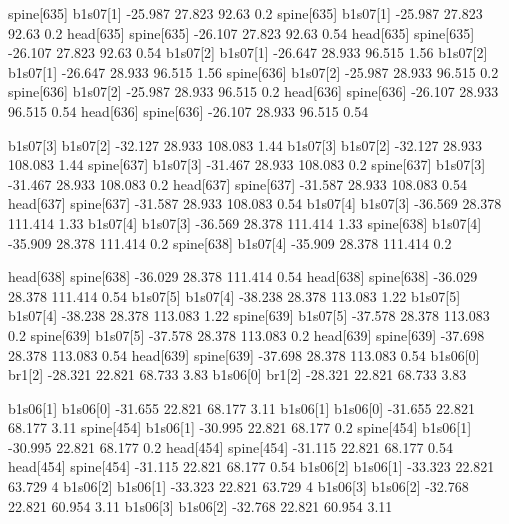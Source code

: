 spine[635]    b1s07[1]    -25.987    27.823    92.63    0.2
spine[635]    b1s07[1]    -25.987    27.823    92.63    0.2
head[635]    spine[635]    -26.107    27.823    92.63    0.54
head[635]    spine[635]    -26.107    27.823    92.63    0.54
b1s07[2]    b1s07[1]    -26.647    28.933    96.515    1.56
b1s07[2]    b1s07[1]    -26.647    28.933    96.515    1.56
spine[636]    b1s07[2]    -25.987    28.933    96.515    0.2
spine[636]    b1s07[2]    -25.987    28.933    96.515    0.2
head[636]    spine[636]    -26.107    28.933    96.515    0.54
head[636]    spine[636]    -26.107    28.933    96.515    0.54


b1s07[3]    b1s07[2]    -32.127    28.933    108.083    1.44
b1s07[3]    b1s07[2]    -32.127    28.933    108.083    1.44
spine[637]    b1s07[3]    -31.467    28.933    108.083    0.2
spine[637]    b1s07[3]    -31.467    28.933    108.083    0.2
head[637]    spine[637]    -31.587    28.933    108.083    0.54
head[637]    spine[637]    -31.587    28.933    108.083    0.54
b1s07[4]    b1s07[3]    -36.569    28.378    111.414    1.33
b1s07[4]    b1s07[3]    -36.569    28.378    111.414    1.33
spine[638]    b1s07[4]    -35.909    28.378    111.414    0.2
spine[638]    b1s07[4]    -35.909    28.378    111.414    0.2


head[638]    spine[638]    -36.029    28.378    111.414    0.54
head[638]    spine[638]    -36.029    28.378    111.414    0.54
b1s07[5]    b1s07[4]    -38.238    28.378    113.083    1.22
b1s07[5]    b1s07[4]    -38.238    28.378    113.083    1.22
spine[639]    b1s07[5]    -37.578    28.378    113.083    0.2
spine[639]    b1s07[5]    -37.578    28.378    113.083    0.2
head[639]    spine[639]    -37.698    28.378    113.083    0.54
head[639]    spine[639]    -37.698    28.378    113.083    0.54
b1s06[0]    br1[2]    -28.321    22.821    68.733    3.83
b1s06[0]    br1[2]    -28.321    22.821    68.733    3.83


b1s06[1]    b1s06[0]    -31.655    22.821    68.177    3.11
b1s06[1]    b1s06[0]    -31.655    22.821    68.177    3.11
spine[454]    b1s06[1]    -30.995    22.821    68.177    0.2
spine[454]    b1s06[1]    -30.995    22.821    68.177    0.2
head[454]    spine[454]    -31.115    22.821    68.177    0.54
head[454]    spine[454]    -31.115    22.821    68.177    0.54
b1s06[2]    b1s06[1]    -33.323    22.821    63.729    4
b1s06[2]    b1s06[1]    -33.323    22.821    63.729    4
b1s06[3]    b1s06[2]    -32.768    22.821    60.954    3.11
b1s06[3]    b1s06[2]    -32.768    22.821    60.954    3.11


